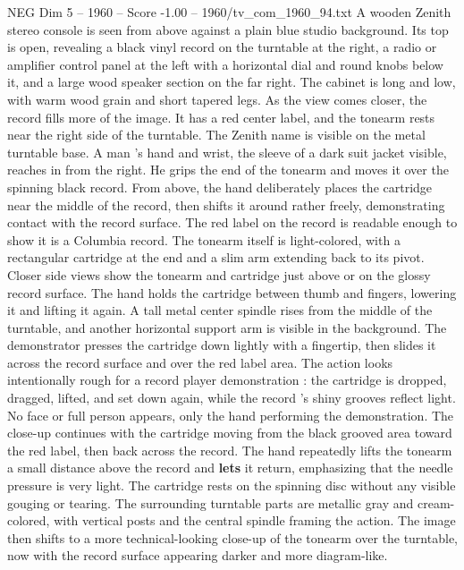 \begin{textsample}{NEG Dim 5 – 1960 – Score -1.00 – 1960/tv\_com\_1960\_94.txt}  \label{ex:f5_neg_047}
A wooden Zenith stereo console is seen from above against a plain blue studio background.
Its top is open, revealing a black vinyl record on the turntable at the right, a radio or amplifier control panel at the left with a horizontal dial and round knobs below it, and a large wood speaker section on the far right.
The cabinet is long and low, with warm wood grain and short tapered legs.
As the view comes closer, the record fills more of the image.
It has a red center label, and the tonearm rests near the right side of the turntable.
The Zenith name is visible on the metal turntable base.
A man ’s hand and wrist, the sleeve of a dark suit jacket visible, reaches in from the right.
He grips the end of the tonearm and moves it over the spinning black record.
From above, the hand deliberately places the cartridge near the middle of the record, then shifts it around rather freely, demonstrating contact with the record surface.
The red label on the record is readable enough to show it is a Columbia record.
The tonearm itself is light-colored, with a rectangular cartridge at the end and a slim arm extending back to its pivot.
Closer side views show the tonearm and cartridge just above or on the glossy record surface.
The hand holds the cartridge between thumb and fingers, lowering it and lifting it again.
A tall metal center spindle rises from the middle of the turntable, and another horizontal support arm is visible in the background.
The demonstrator presses the cartridge down lightly with a fingertip, then slides it across the record surface and over the red label area.
The action looks intentionally rough for a record player demonstration : the cartridge is dropped, dragged, lifted, and set down again, while the record ’s shiny grooves reflect light.
No face or full person appears, only the hand performing the demonstration.
The close-up continues with the cartridge moving from the black grooved area toward the red label, then back across the record.
The hand repeatedly lifts the tonearm a small distance above the record and \textbf{lets} it return, emphasizing that the needle pressure is very light.
The cartridge rests on the spinning disc without any visible gouging or tearing.
The surrounding turntable parts are metallic gray and cream-colored, with vertical posts and the central spindle framing the action.
The image then shifts to a more technical-looking close-up of the tonearm over the turntable, now with the record surface appearing darker and more diagram-like.

\end{textsample}
